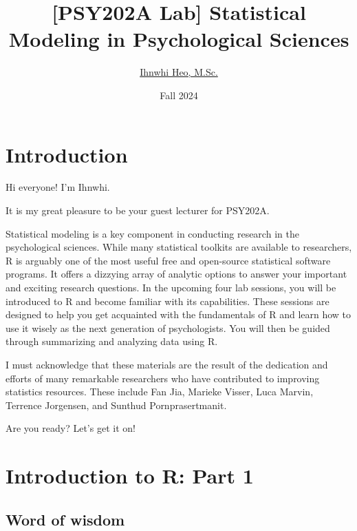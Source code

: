 \documentclass[
]{book}
\title{{[}PSY202A Lab{]} Statistical Modeling in Psychological Sciences}
\author{\href{https://ihnwhiheo.github.io/}{Ihnwhi Heo, M.Sc.}}
\date{Fall 2024}
\begin{document}
\maketitle

{
\setcounter{tocdepth}{1}
\tableofcontents
}
\chapter{Introduction}\label{introduction}

Hi everyone! I'm Ihnwhi.

It is my great pleasure to be your guest lecturer for PSY202A.

Statistical modeling is a key component in conducting research in the psychological sciences. While many statistical toolkits are available to researchers, R is arguably one of the most useful free and open-source statistical software programs. It offers a dizzying array of analytic options to answer your important and exciting research questions. In the upcoming four lab sessions, you will be introduced to R and become familiar with its capabilities. These sessions are designed to help you get acquainted with the fundamentals of R and learn how to use it wisely as the next generation of psychologists. You will then be guided through summarizing and analyzing data using R.

I must acknowledge that these materials are the result of the dedication and efforts of many remarkable researchers who have contributed to improving statistics resources. These include Fan Jia, Marieke Visser, Luca Marvin, Terrence Jorgensen, and Sunthud Pornprasertmanit.

Are you ready? Let's get it on!

\chapter{Introduction to R: Part 1}\label{introduction-to-r-part-1}

\section{Word of wisdom}\label{word-of-wisdom}
\end{document}
